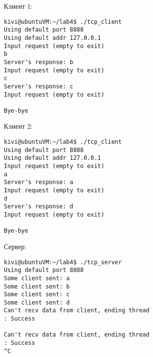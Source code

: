 \documentclass[a4paper]{article}
\begin{document}
	Клиент 1:
	\begin{lstlisting}[style=crs_bash]
kivi@ubuntuVM:~/lab4$ ./tcp_client 
Using default port 8888
Using default addr 127.0.0.1
Input request (empty to exit)
b
Server's response: b
Input request (empty to exit)
c
Server's response: c
Input request (empty to exit)

Bye-bye
	\end{lstlisting}
	
	Клиент 2:
	\begin{lstlisting}[style=crs_bash]
kivi@ubuntuVM:~/lab4$ ./tcp_client 
Using default port 8888
Using default addr 127.0.0.1
Input request (empty to exit)
a
Server's response: a
Input request (empty to exit)
d
Server's response: d
Input request (empty to exit)

Bye-bye
	\end{lstlisting}
	
	Сервер:
	\begin{lstlisting}[style=crs_bash]
kivi@ubuntuVM:~/lab4$ ./tcp_server 
Using default port 8888
Some client sent: a
Some client sent: b
Some client sent: c
Some client sent: d
Can't recv data from client, ending thread
: Success

Can't recv data from client, ending thread
: Success
^C
	\end{lstlisting}
	
\end{document}
